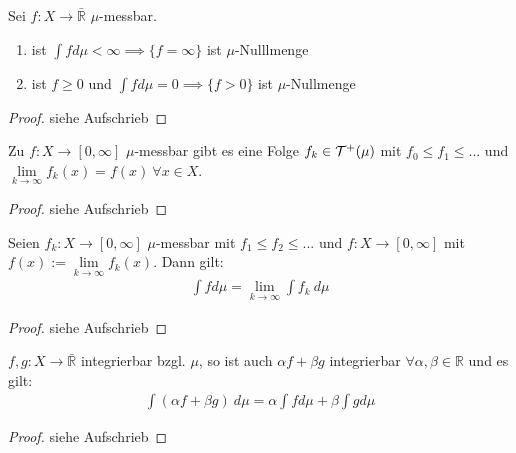   \begin{lemma}
    Sei $f: X \to \bar{\mathbb{R}}$ $\mu$-messbar.
    \begin{enumerate}[label=\roman*)]
      \item ist $\int f d\mu < \infty \implies \{f = \infty\}$ ist $\mu$-Nulllmenge
      \item ist $f \geq 0$ und $\int f d\mu = 0 \implies \{f > 0\}$ ist $\mu$-Nullmenge
    \end{enumerate}
  \end{lemma}

  \begin{proof}
    siehe Aufschrieb
  \end{proof}

  \begin{theorem}
    Zu $f: X \to [0,\infty]$ $\mu$-messbar gibt es eine Folge $f_k \in \mathcal{T}^+(\mu)$ mit $f_0 \leq f_1 \leq ...$ und $\lim\limits_{k \to \infty} f_k(x) = f(x) \ \forall x \in X$.
  \end{theorem}

  \begin{proof}
    siehe Aufschrieb
  \end{proof}

  \begin{theorem}
    Seien $f_k:X \to [0,\infty]$ $\mu$-messbar mit $f_1 \leq f_2 \leq ...$ und $f: X \to [0, \infty]$ mit $f(x) := \lim\limits_{k \to \infty} f_k(x)$. Dann gilt:
    \begin{align*}
      \int f d\mu = \lim\limits_{k \to \infty} \int f_k \ d\mu
    \end{align*}
  \end{theorem}

  \begin{proof}
    siehe Aufschrieb
  \end{proof}

  \begin{theorem}
    $f,g: X \to \bar{\mathbb{R}}$ integrierbar bzgl. $\mu$, so ist auch $\alpha f + \beta g$ integrierbar $\forall \alpha, \beta \in \mathbb{R}$ und es gilt:
    \begin{align*}
      \int (\alpha f + \beta g) \ d\mu = \alpha \int f d\mu + \beta \int g d\mu
    \end{align*}
  \end{theorem}

  \begin{proof}
    siehe Aufschrieb
  \end{proof}

